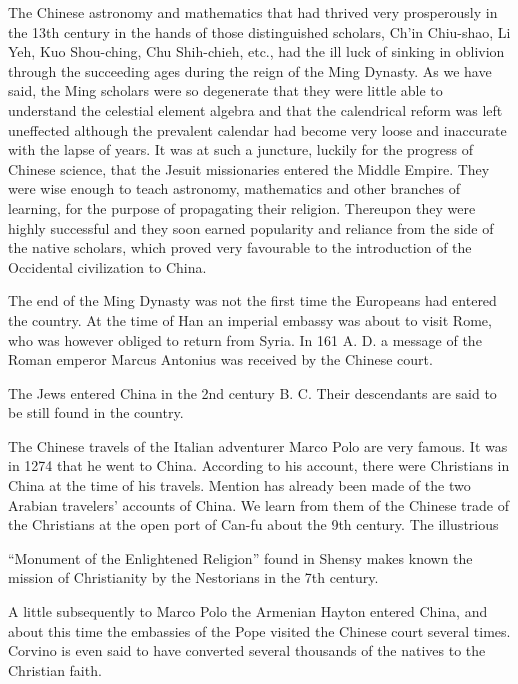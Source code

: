 \documentclass[11pt]{article}
\newcommand{\scanpage}[2]{\clearpage\setcounter{footnote}{0}\noindent{\footnotesize\color{gray}PDF page #1 · #2}\par\medskip}
\newcommand{\scanfooter}{}
\begin{document}
The Chinese astronomy and mathematics that had thrived very prosperously in the 13th century in the hands of those distinguished scholars, Ch'in Chiu-shao, Li Yeh, Kuo Shou-ching, Chu Shih-chieh, etc., had the ill luck of sinking in oblivion through the succeeding ages during the reign of the Ming Dynasty. As we have said, the Ming scholars were so degenerate that they were little able to understand the celestial element algebra and that the calendrical reform was left uneffected although the prevalent calendar had become very loose and inaccurate with the lapse of years. It was at such a juncture, luckily for the progress of Chinese science, that the Jesuit missionaries entered the Middle Empire. They were wise enough to teach astronomy, mathematics and other branches of learning, for the purpose of propagating their religion. Thereupon they were highly successful and they soon earned popularity and reliance from the side of the native scholars, which proved very favourable to the introduction of the Occidental civilization to China.

The end of the Ming Dynasty was not the first time the Europeans had entered the country. At the time of Han an imperial embassy was about to visit Rome, who was however obliged to return from Syria. In 161 A. D. a message of the Roman emperor Marcus Antonius was received by the Chinese court.

The Jews entered China in the 2nd century B. C. Their descendants are said to be still found in the country.

The Chinese travels of the Italian adventurer Marco Polo are very famous. It was in 1274 that he went to China. According to his account, there were Christians in China at the time of his travels. Mention has already been made of the two Arabian travelers' accounts of China. We learn from them of the Chinese trade of the Christians at the open port of Can-fu about the 9th century. The illustrious
\scanfooter

\scanpage{0127}{Chapter 17, printed page 113}
``Monument of the Enlightened Religion'' found in Shensy makes known the mission of Christianity by the Nestorians in the 7th century.

A little subsequently to Marco Polo the Armenian Hayton entered China, and about this time the embassies of the Pope visited the Chinese court several times. Corvino is even said to have converted several thousands of the natives to the Christian faith.
\end{document}

